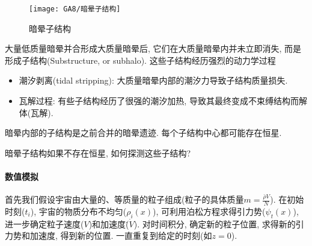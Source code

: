 \begin{figure}[!htb]
    \centering
    \texttt{[image: GA8/暗晕子结构]}
    \caption{暗晕子结构}
\end{figure}

大量低质量暗晕并合形成大质量暗晕后, 它们在大质量暗晕内并未立即消失, 而是形成子结构(Substructure, or subhalo). 这些子结构经历强烈的动力学过程
\begin{itemize}\small
    \item 潮汐剥离(tidal stripping): 大质量暗晕内部的潮汐力导致子结构质量损失. 
    \item 瓦解过程: 有些子结构经历了很强的潮汐加热, 导致其最终变成不束缚结构而解体(瓦解). 
\end{itemize}

暗晕内部的子结构是之前合并的暗晕遗迹. 每个子结构中心都可能存在恒星. 

暗晕子结构如果不存在恒星, 如何探测这些子结构?

\paragraph{数值模拟}
首先我们假设宇宙由大量的、等质量的粒子组成(粒子的具体质量$m=\frac{\bar{\rho}V}{N}$). 在初始时刻($t_i$), 宇宙的物质分布不均匀($\rho_i(x)$), 可利用泊松方程求得引力势($\psi_t(x)$), 进一步确定粒子速度($V$)和加速度(̇$\dot{V}$). 对时间积分, 确定新的粒子位置, 求得新的引力势和加速度, 得到新的位置. 一直重复到给定的时刻(如$z=0$). 

